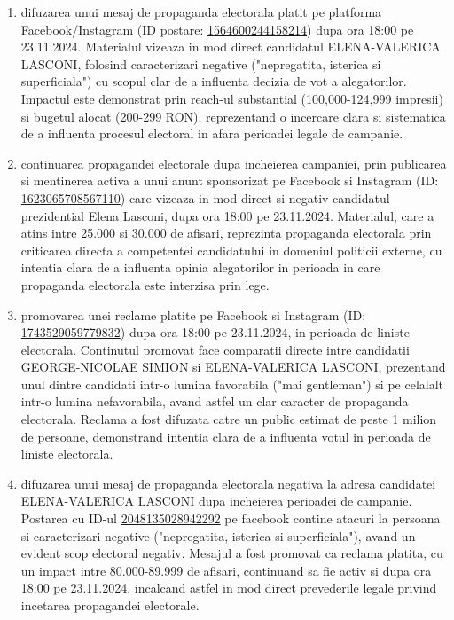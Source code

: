 \documentclass[a4paper,12pt]{article}
\begin{document}
\begin{enumerate}[leftmargin=*, label=\arabic*.)]
    \item difuzarea unui mesaj de propaganda electorala platit pe platforma Facebook/Instagram (ID postare: \href{https://www.facebook.com/ads/library/?id=1564600244158214}{1564600244158214}) dupa ora 18:00 pe 23.11.2024. Materialul vizeaza in mod direct candidatul ELENA-VALERICA LASCONI, folosind caracterizari negative ("nepregatita, isterica si superficiala") cu scopul clar de a influenta decizia de vot a alegatorilor. Impactul este demonstrat prin reach-ul substantial (100,000-124,999 impresii) si bugetul alocat (200-299 RON), reprezentand o incercare clara si sistematica de a influenta procesul electoral in afara perioadei legale de campanie.
    \item continuarea propagandei electorale dupa incheierea campaniei, prin publicarea si mentinerea activa a unui anunt sponsorizat pe Facebook si Instagram (ID: \href{https://www.facebook.com/ads/library/?id=1623065708567110}{1623065708567110}) care vizeaza in mod direct si negativ candidatul prezidential Elena Lasconi, dupa ora 18:00 pe 23.11.2024. Materialul, care a atins intre 25.000 si 30.000 de afisari, reprezinta propaganda electorala prin criticarea directa a competentei candidatului in domeniul politicii externe, cu intentia clara de a influenta opinia alegatorilor in perioada in care propaganda electorala este interzisa prin lege.
    \item promovarea unei reclame platite pe Facebook si Instagram (ID: \href{https://www.facebook.com/ads/library/?id=1743529059779832}{1743529059779832}) dupa ora 18:00 pe 23.11.2024, in perioada de liniste electorala. Continutul promovat face comparatii directe intre candidatii GEORGE-NICOLAE SIMION si ELENA-VALERICA LASCONI, prezentand unul dintre candidati intr-o lumina favorabila ("mai gentleman") si pe celalalt intr-o lumina nefavorabila, avand astfel un clar caracter de propaganda electorala. Reclama a fost difuzata catre un public estimat de peste 1 milion de persoane, demonstrand intentia clara de a influenta votul in perioada de liniste electorala.
    \item difuzarea unui mesaj de propaganda electorala negativa la adresa candidatei ELENA-VALERICA LASCONI dupa incheierea perioadei de campanie. Postarea cu ID-ul \href{https://www.facebook.com/ads/library/?id=2048135028942292}{2048135028942292} pe facebook contine atacuri la persoana si caracterizari negative ("nepregatita, isterica si superficiala"), avand un evident scop electoral negativ. Mesajul a fost promovat ca reclama platita, cu un impact intre 80.000-89.999 de afisari, continuand sa fie activ si dupa ora 18:00 pe 23.11.2024, incalcand astfel in mod direct prevederile legale privind incetarea propagandei electorale.

\end{enumerate}
\end{document}
